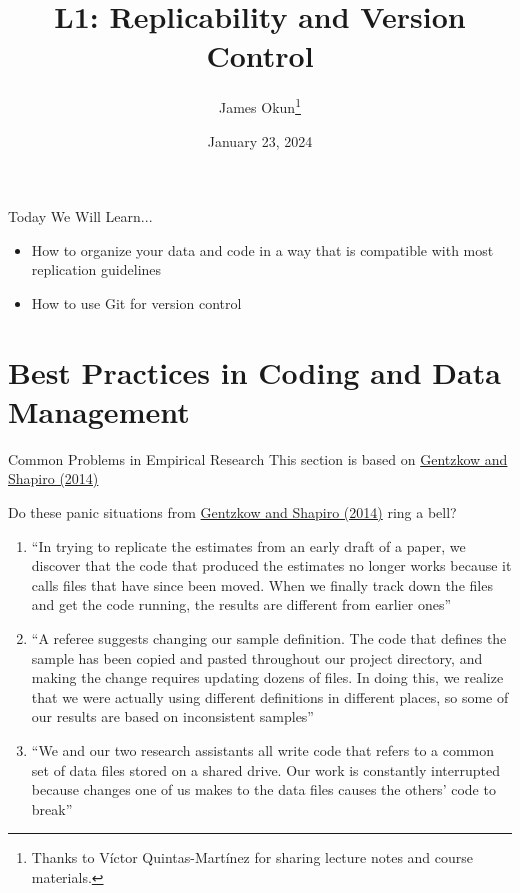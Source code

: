 \documentclass[10pt, aspectratio=169, xcolor=dvipsnames]{beamer}
\title{L1: Replicability and Version Control}
\author{James Okun\footnote{Thanks to Víctor Quintas-Martínez for sharing lecture notes and course materials.}}
\institute{MIT}
\date{January 23, 2024}
\let\olditem\item
\renewcommand{\item}{%
\olditem\vspace{0.3em}}
\begin{document}
\begin{frame}
\maketitle
\end{frame}

\begin{frame}{Today We Will Learn...}
\begin{itemize}
    \item How to organize your data and code in a way that is compatible with most replication guidelines
    \item How to use Git for version control
\end{itemize}
\end{frame}

\section{Best Practices in Coding and Data Management}
\begin{frame}[t]{Common Problems in Empirical Research}
    \footnotesize This section is based on \href{https://web.stanford.edu/~gentzkow/research/CodeAndData.pdf}{Gentzkow and Shapiro (2014)}

    \normalsize\vspace{0.5em} Do these panic situations from \href{https://web.stanford.edu/~gentzkow/research/CodeAndData.pdf}{Gentzkow and Shapiro (2014)} ring a bell? 
    \begin{enumerate}
        \item ``In trying to replicate the estimates from an early draft of a paper, we discover that the code that produced the estimates no longer works because it calls files that have since been moved. When we finally track down the files and get the code running, the results are different from  earlier ones''
        \item ``A referee suggests changing our sample definition. The code that defines the sample has been copied and pasted throughout our project directory, and making the change requires updating dozens of files. In doing this, we realize that we were actually using different definitions in different places, so some of our results are based on inconsistent samples''
        \item ``We and our two research assistants all write code that refers to a common set of data files stored on a shared drive. Our work is constantly interrupted because changes one of us makes to the data files causes the others' code to break''
    \end{enumerate}
\end{frame}
\end{document}
